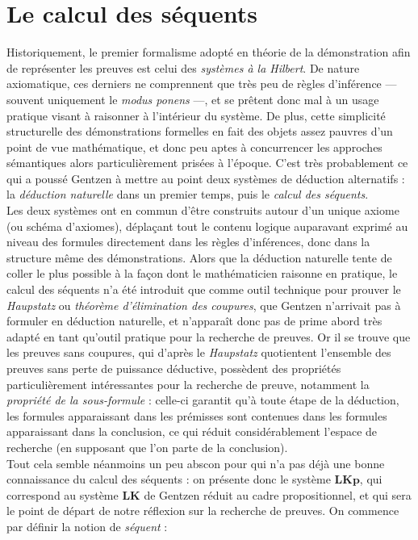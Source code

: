 \documentclass[12pt]{report}
\begin{document}
\section{Le calcul des séquents}

Historiquement, le premier formalisme adopté en théorie de la démonstration afin de représenter les preuves est celui des \emph{systèmes à la Hilbert}. De nature axiomatique, ces derniers ne comprennent que très peu de règles d'inférence --- souvent uniquement le \textit{modus ponens} ---, et se prêtent donc mal à un usage pratique visant à raisonner à l'intérieur du système. De plus, cette simplicité structurelle des démonstrations formelles en fait des objets assez pauvres d'un point de vue mathématique, et donc peu aptes à concurrencer les approches sémantiques alors particulièrement prisées à l'époque. C'est très probablement ce qui a poussé Gentzen à mettre au point deux systèmes de déduction alternatifs : la \emph{déduction naturelle} dans un premier temps, puis le \emph{calcul des séquents}.\\

Les deux systèmes ont en commun d'être construits autour d'un unique axiome (ou schéma d'axiomes), déplaçant tout le contenu logique auparavant exprimé au niveau des formules directement dans les règles d'inférences, donc dans la structure même des démonstrations. Alors que la déduction naturelle tente de coller le plus possible à la façon dont le mathématicien raisonne en pratique, le calcul des séquents n'a été introduit que comme outil technique pour prouver le \textit{Haupstatz} ou \emph{théorème d'élimination des coupures}, que Gentzen n'arrivait pas à formuler en déduction naturelle, et n'apparaît donc pas de prime abord très adapté en tant qu'outil pratique pour la recherche de preuves. Or il se trouve que les preuves sans coupures, qui d'après le \textit{Haupstatz} quotientent l'ensemble des preuves sans perte de puissance déductive, possèdent des propriétés particulièrement intéressantes pour la recherche de preuve, notamment la \emph{propriété de la sous-formule} : celle-ci garantit qu'à toute étape de la déduction, les formules apparaissant dans les prémisses sont contenues dans les formules apparaissant dans la conclusion, ce qui réduit considérablement l'espace de recherche (en supposant que l'on parte de la conclusion).\\

Tout cela semble néanmoins un peu abscon pour qui n'a pas déjà une bonne connaissance du calcul des séquents : on présente donc le système $\mathbf{LKp}$, qui correspond au système $\mathbf{LK}$ de Gentzen réduit au cadre propositionnel, et qui sera le point de départ de notre réflexion sur la recherche de preuves. On commence par définir la notion de \emph{séquent} :
\end{document}
